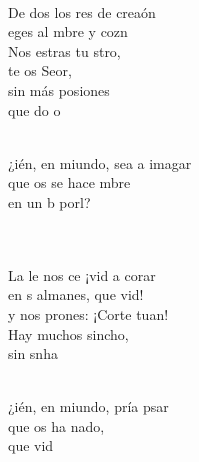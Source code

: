 \documentclass[12pt]{article}
\begin{document}
\begin{multicols*}{2}
\begin{cancion}
	  \\
\jump
	De dos los res de  creaón\\
	eges al mbre y  cozn \\
	Nos estras tu stro, \\
	te os Seor,\\
	sin más posiones \\
	que do  o \\\jump\\
	\begin{chorus}%
	¿ién, en miundo, sea a imagar \\
	que os se hace mbre\\
	en un b porl?  \\
	\end{chorus}%
	\jump\\
	   \\
	La le nos ce ¡vid a corar\\
	en s almanes, que  vid! \\
	y  nos prones: ¡Corte tuan! \\
	Hay muchos sincho, \\
	sin snha\\\jump\\
	\begin{chorus}%
	¿ién, en miundo, pría psar \\
	que os ha nado,\\
	que  vid \\

\end{chorus}
\end{cancion}
\end{multicols*}
\end{document}
